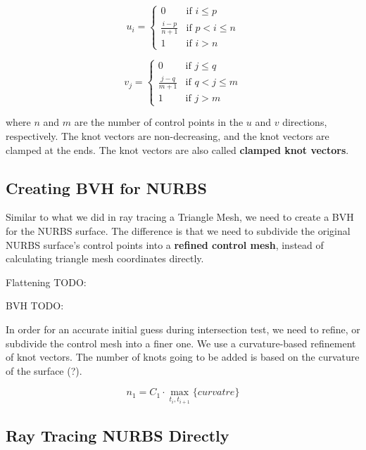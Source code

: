 \documentclass[acmtog]{acmart}
\begin{document}
\begin{equation}
\label{eq:2}
u_{i} = \begin{cases}
0 & \text{if } i \leq p \\
\frac{i-p}{n+1} & \text{if } p < i \leq n \\
1 & \text{if } i > n
\end{cases}
\end{equation}

\begin{equation}
\label{eq:3}
v_{j} = \begin{cases}
0 & \text{if } j \leq q \\
\frac{j-q}{m+1} & \text{if } q < j \leq m \\
1 & \text{if } j > m
\end{cases}
\end{equation}

where $n$ and $m$ are the number of control points in the $u$ and $v$ directions, respectively. The knot vectors are non-decreasing, and the knot vectors are clamped at the ends. The knot vectors are also called \textbf{clamped knot vectors}.

\subsection{Creating BVH for NURBS}


Similar to what we did in ray tracing a Triangle Mesh, we need to create a BVH for the NURBS surface. The difference is that we need to subdivide the original NURBS surface's control points into a \textbf{refined control mesh}, instead of calculating triangle mesh coordinates directly. 

Flattening TODO:

BVH TODO:

In order for an accurate initial guess during intersection test, we need to refine, or subdivide the control mesh into a finer one. We use a curvature-based refinement of knot vectors. The number of knots going to be added is based on the curvature of the surface (?). 

\[
	n_1 = C_1 \cdot \max_{t_i, t_{i+1}} \{ curvatre \}	
\]

\subsection{Ray Tracing NURBS Directly}
\end{document}
